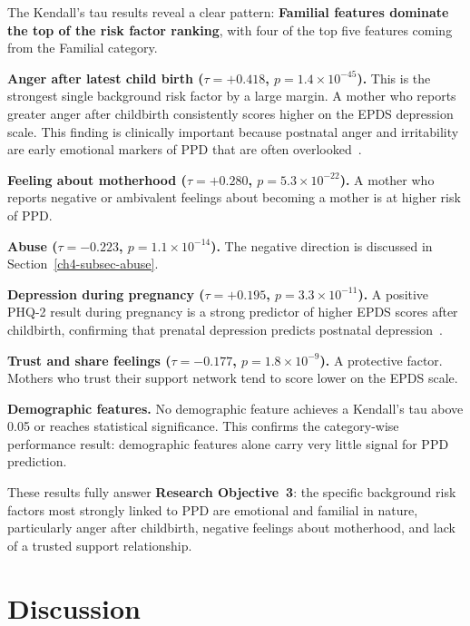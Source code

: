 The Kendall's tau results reveal a clear pattern: \textbf{Familial features dominate the top of the risk factor ranking}, with four of the top five features coming from the Familial category.

\textbf{Anger after latest child birth ($\tau = +0.418$, $p = 1.4 \times 10^{-45}$).}
This is the strongest single background risk factor by a large margin.
A mother who reports greater anger after childbirth consistently scores higher on the EPDS depression scale.
This finding is clinically important because postnatal anger and irritability are early emotional markers of PPD that are often overlooked~\cite{yazdkhasti2026systematic}.

\textbf{Feeling about motherhood ($\tau = +0.280$, $p = 5.3 \times 10^{-22}$).}
A mother who reports negative or ambivalent feelings about becoming a mother is at higher risk of PPD.

\textbf{Abuse ($\tau = -0.223$, $p = 1.1 \times 10^{-14}$).}
The negative direction is discussed in Section~\ref{ch4-subsec-abuse}.

\textbf{Depression during pregnancy ($\tau = +0.195$, $p = 3.3 \times 10^{-11}$).}
A positive PHQ-2 result during pregnancy is a strong predictor of higher EPDS scores after childbirth, confirming that prenatal depression predicts postnatal depression~\cite{yazdkhasti2026systematic}.

\textbf{Trust and share feelings ($\tau = -0.177$, $p = 1.8 \times 10^{-9}$).}
A protective factor. Mothers who trust their support network tend to score lower on the EPDS scale.

\textbf{Demographic features.}
No demographic feature achieves a Kendall's tau above 0.05 or reaches statistical significance.
This confirms the category-wise performance result: demographic features alone carry very little signal for PPD prediction.

These results fully answer \textbf{Research Objective~3}: the specific background risk factors most strongly linked to PPD are emotional and familial in nature, particularly anger after childbirth, negative feelings about motherhood, and lack of a trusted support relationship.

\section{Discussion}
\label{ch4-sec-discussion}

